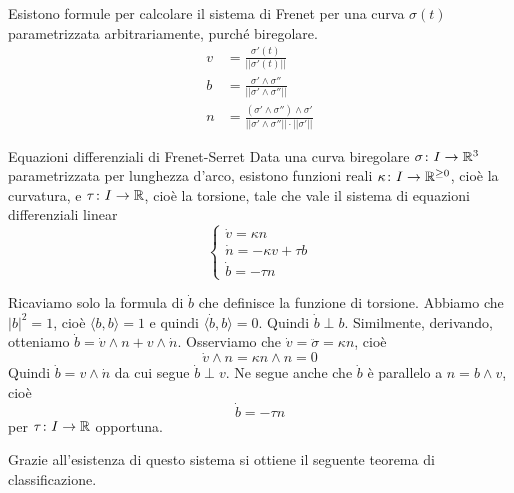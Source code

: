 \documentclass[a4paper]{article}
\begin{document}
\begin{snippetproposition}{}
    Esistono formule per calcolare il sistema di Frenet per una curva \(\sigma(t)\) parametrizzata arbitrariamente,
    purché biregolare.
    \begin{align*}
        v &= \frac{\sigma'(t)}{||\sigma'(t)||} \\
        b &= \frac{\sigma' \wedge \sigma''}{||\sigma' \wedge \sigma''||} \\
        n &= \frac{
            (\sigma' \wedge \sigma'') \wedge \sigma'
        }{
            ||\sigma' \wedge \sigma''|| \cdot ||\sigma'||
        }
    \end{align*}
\end{snippetproposition}

\begin{snippettheorem}{Equazioni differenziali di Frenet-Serret}
    Data una curva biregolare \(\sigma\colon I \to \mathbb{R}^3\)
    parametrizzata per lunghezza d'arco, esistono
    funzioni reali \(\kappa \colon I \to \mathbb{R}^{\geq 0}\),
    cioè la curvatura, e \(\tau \colon I \to \mathbb{R}\),
    cioè la torsione, tale che vale il sistema di equazioni differenziali linear \[
        \begin{cases}
            \dot v = \kappa n \\
            \dot n = -\kappa v + \tau b\\
            \dot b = -\tau n
        \end{cases}
    \]
\end{snippettheorem}

\begin{snippetproof}{}
    Ricaviamo solo la formula di \(\dot b\) che definisce la funzione di torsione.
    Abbiamo che \(|b|^2 = 1\), cioè \(\langle b,b\rangle = 1\) e quindi \(\langle \dot b, b \rangle =0\).
    Quindi \(\dot b \perp b\).
    Similmente, derivando, otteniamo \(\dot b = \dot v \wedge n + v \wedge \dot n\).
    Osserviamo che \(\dot v = \ddot \sigma = \kappa n\),
    cioè \[
        \dot v \wedge n = \kappa n \wedge n = 0
    \]
    Quindi \(\dot b = v \wedge \dot n\) da cui segue
    \(\dot b \perp v\).
    Ne segue anche che \(\dot b\) è parallelo a \(n = b \wedge v\),
    cioè \[
        \dot b = - \tau n
    \]
    per \(\tau \colon I \to \mathbb{R}\) opportuna.
\end{snippetproof}

Grazie all'esistenza di questo sistema si ottiene il seguente teorema di classificazione.
\end{document}
